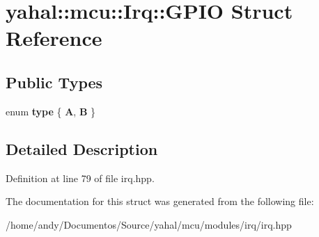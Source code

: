 \hypertarget{structyahal_1_1mcu_1_1_irq_1_1_g_p_i_o}{}\section{yahal\+:\+:mcu\+:\+:Irq\+:\+:G\+P\+I\+O Struct Reference}
\label{structyahal_1_1mcu_1_1_irq_1_1_g_p_i_o}
\subsection*{Public Types}
\begin{DoxyCompactItemize}
\item 
\hypertarget{structyahal_1_1mcu_1_1_irq_1_1_g_p_i_o_a32d7b87ae60ee74fae28b3df5ff17d1f}{}enum {\bfseries type} \{ {\bfseries A}, 
{\bfseries B}
 \}\label{structyahal_1_1mcu_1_1_irq_1_1_g_p_i_o_a32d7b87ae60ee74fae28b3df5ff17d1f}

\end{DoxyCompactItemize}


\subsection{Detailed Description}


Definition at line 79 of file irq.\+hpp.



The documentation for this struct was generated from the following file\+:\begin{DoxyCompactItemize}
\item 
/home/andy/\+Documentos/\+Source/yahal/mcu/modules/irq/irq.\+hpp\end{DoxyCompactItemize}
